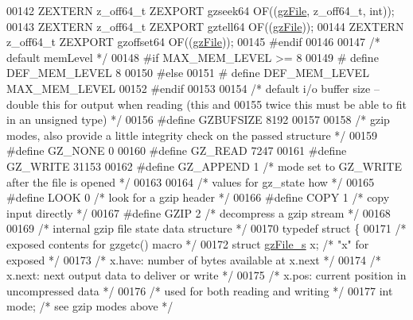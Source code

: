 \begin{DoxyCode}
00142     ZEXTERN z\_off64\_t ZEXPORT gzseek64 OF((\hyperlink{structgz_file__s}{gzFile}, z\_off64\_t, \textcolor{keywordtype}{int}));
00143     ZEXTERN z\_off64\_t ZEXPORT gztell64 OF((\hyperlink{structgz_file__s}{gzFile}));
00144     ZEXTERN z\_off64\_t ZEXPORT gzoffset64 OF((\hyperlink{structgz_file__s}{gzFile}));
00145 \textcolor{preprocessor}{#endif}
00146 
00147 \textcolor{comment}{/* default memLevel */}
00148 \textcolor{preprocessor}{#if MAX\_MEM\_LEVEL >= 8}
00149 \textcolor{preprocessor}{#  define DEF\_MEM\_LEVEL 8}
00150 \textcolor{preprocessor}{#else}
00151 \textcolor{preprocessor}{#  define DEF\_MEM\_LEVEL  MAX\_MEM\_LEVEL}
00152 \textcolor{preprocessor}{#endif}
00153 
00154 \textcolor{comment}{/* default i/o buffer size -- double this for output when reading (this and}
00155 \textcolor{comment}{   twice this must be able to fit in an unsigned type) */}
00156 \textcolor{preprocessor}{#define GZBUFSIZE 8192}
00157 
00158 \textcolor{comment}{/* gzip modes, also provide a little integrity check on the passed structure */}
00159 \textcolor{preprocessor}{#define GZ\_NONE 0}
00160 \textcolor{preprocessor}{#define GZ\_READ 7247}
00161 \textcolor{preprocessor}{#define GZ\_WRITE 31153}
00162 \textcolor{preprocessor}{#define GZ\_APPEND 1     }\textcolor{comment}{/* mode set to GZ\_WRITE after the file is opened */}\textcolor{preprocessor}{}
00163 
00164 \textcolor{comment}{/* values for gz\_state how */}
00165 \textcolor{preprocessor}{#define LOOK 0      }\textcolor{comment}{/* look for a gzip header */}\textcolor{preprocessor}{}
00166 \textcolor{preprocessor}{#define COPY 1      }\textcolor{comment}{/* copy input directly */}\textcolor{preprocessor}{}
00167 \textcolor{preprocessor}{#define GZIP 2      }\textcolor{comment}{/* decompress a gzip stream */}\textcolor{preprocessor}{}
00168 
00169 \textcolor{comment}{/* internal gzip file state data structure */}
00170 \textcolor{keyword}{typedef} \textcolor{keyword}{struct }\{
00171         \textcolor{comment}{/* exposed contents for gzgetc() macro */}
00172     \textcolor{keyword}{struct }\hyperlink{structgz_file__s}{gzFile\_s} x;      \textcolor{comment}{/* "x" for exposed */}
00173                             \textcolor{comment}{/* x.have: number of bytes available at x.next */}
00174                             \textcolor{comment}{/* x.next: next output data to deliver or write */}
00175                             \textcolor{comment}{/* x.pos: current position in uncompressed data */}
00176         \textcolor{comment}{/* used for both reading and writing */}
00177     \textcolor{keywordtype}{int} mode;               \textcolor{comment}{/* see gzip modes above */}

\end{DoxyCode}
